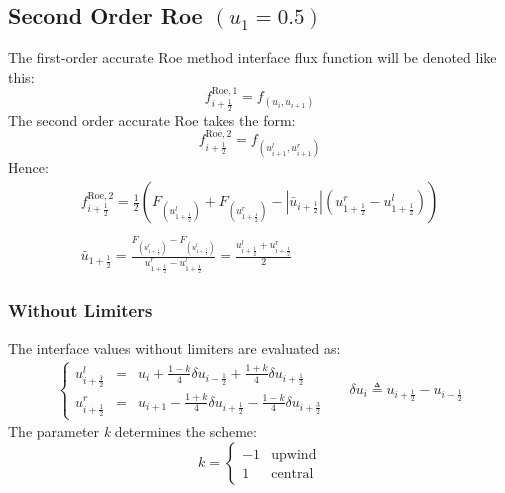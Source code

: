 \documentclass[11pt, a4paper]{article}
\begin{document}
\subsection{Second Order Roe $(u_1 = 0.5)$}
The first-order accurate Roe method interface flux function will be denoted like this:
\begin{equation*}
    f_{i+\frac{1}{2}}^{\mathrm{Roe},1}=f_{\left(u_i, u_{i+1}\right)}
\end{equation*}
The second order accurate Roe takes the form:
\begin{equation*}
    f_{i+\frac{1}{2}}^{\mathrm{Roe},2}=f_{\left(u_{i+1}^l, u_{i+1}^r\right)}
\end{equation*}
Hence:
\begin{equation}
    \begin{matrix}
        \displaystyle f_{i+\frac{1}{2}}^{\mathrm{Roe},2}=\frac{1}{2}\left(F_{\left(u_{1+\frac{1}{2}}^l\right)}+F_{\left(u_{1+\frac{1}{2}}^r\right)}-\left|\bar{u}_{i+\frac{1}{2}}\right|\left(u_{1+\frac{1}{2}}^r-u_{1+\frac{1}{2}}^l\right)\right) \\\\
        \displaystyle \bar{u}_{1+\frac{1}{2}}=\frac{F_{\left(u_{1+\frac{1}{2}}^r\right)}-F_{\left(u_{1+\frac{1}{2}}^l\right)}}{u_{1+\frac{1}{2}}^r-u_{1+\frac{1}{2}}^l} = \frac{u_{i+\frac{1}{2}}^l+u_{i+\frac{1}{2}}^r}{2}
    \end{matrix}
\end{equation}

\subsubsection{Without Limiters}
The interface values without limiters are evaluated as:
\begin{equation}
    \begin{matrix}
        \left\{\begin{array}{lcl}
            u_{i+\frac{1}{2}}^l & = & u_i+\frac{1-k}{4}\delta u_{i-\frac{1}{2}}+\frac{1+k}{4}\delta u_{i+\frac{1}{2}} \\
            u_{i+\frac{1}{2}}^r & = & u_{i+1}-\frac{1+k}{4}\delta u_{i+\frac{1}{2}}-\frac{1-k}{4}\delta u_{i+\frac{3}{2}}
        \end{array}\right. && \delta u_i\triangleq u_{i+\frac{1}{2}} - u_{i-\frac{1}{2}}
    \end{matrix}
\end{equation}
The parameter \emph{k} determines the scheme:
\begin{equation*}
    k = \left\{\begin{array}{cr}
        -1 & \mathrm{upwind} \\
        1 & \mathrm{central}
    \end{array}\right.
\end{equation*}
\end{document}
